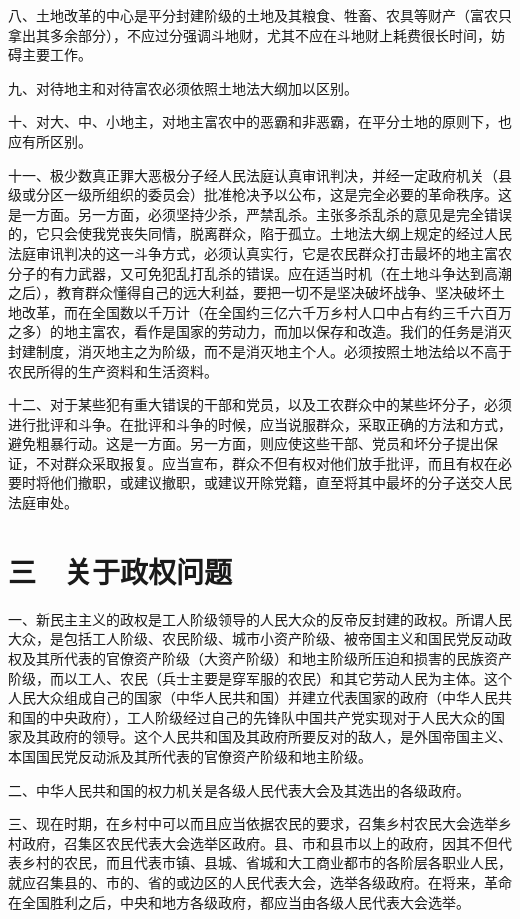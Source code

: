 八、土地改革的中心是平分封建阶级的土地及其粮食、牲畜、农具等财产（富农只拿出其多余部分），不应过分强调斗地财，尤其不应在斗地财上耗费很长时间，妨碍主要工作。

九、对待地主和对待富农必须依照土地法大纲加以区别。

十、对大、中、小地主，对地主富农中的恶霸和非恶霸，在平分土地的原则下，也应有所区别。

十一、极少数真正罪大恶极分子经人民法庭认真审讯判决，并经一定政府机关（县级或分区一级所组织的委员会）批准枪决予以公布，这是完全必要的革命秩序。这是一方面。另一方面，必须坚持少杀，严禁乱杀。主张多杀乱杀的意见是完全错误的，它只会使我党丧失同情，脱离群众，陷于孤立。土地法大纲上规定的经过人民法庭审讯判决的这一斗争方式，必须认真实行，它是农民群众打击最坏的地主富农分子的有力武器，又可免犯乱打乱杀的错误。应在适当时机（在土地斗争达到高潮之后），教育群众懂得自己的远大利益，要把一切不是坚决破坏战争、坚决破坏土地改革，而在全国数以千万计（在全国约三亿六千万乡村人口中占有约三千六百万之多）的地主富农，看作是国家的劳动力，而加以保存和改造。我们的任务是消灭封建制度，消灭地主之为阶级，而不是消灭地主个人。必须按照土地法给以不高于农民所得的生产资料和生活资料。

十二、对于某些犯有重大错误的干部和党员，以及工农群众中的某些坏分子，必须进行批评和斗争。在批评和斗争的时候，应当说服群众，采取正确的方法和方式，避免粗暴行动。这是一方面。另一方面，则应使这些干部、党员和坏分子提出保证，不对群众采取报复。应当宣布，群众不但有权对他们放手批评，而且有权在必要时将他们撤职，或建议撤职，或建议开除党籍，直至将其中最坏的分子送交人民法庭审处。

\section{三　关于政权问题}

一、新民主主义的政权是工人阶级领导的人民大众的反帝反封建的政权。所谓人民大众，是包括工人阶级、农民阶级、城市小资产阶级、被帝国主义和国民党反动政权及其所代表的官僚资产阶级（大资产阶级）和地主阶级所压迫和损害的民族资产阶级，而以工人、农民（兵士主要是穿军服的农民）和其它劳动人民为主体。这个人民大众组成自己的国家（中华人民共和国）并建立代表国家的政府（中华人民共和国的中央政府），工人阶级经过自己的先锋队中国共产党实现对于人民大众的国家及其政府的领导。这个人民共和国及其政府所要反对的敌人，是外国帝国主义、本国国民党反动派及其所代表的官僚资产阶级和地主阶级。

二、中华人民共和国的权力机关是各级人民代表大会及其选出的各级政府。

三、现在时期，在乡村中可以而且应当依据农民的要求，召集乡村农民大会选举乡村政府，召集区农民代表大会选举区政府。县、市和县市以上的政府，因其不但代表乡村的农民，而且代表市镇、县城、省城和大工商业都市的各阶层各职业人民，就应召集县的、市的、省的或边区的人民代表大会，选举各级政府。在将来，革命在全国胜利之后，中央和地方各级政府，都应当由各级人民代表大会选举。

